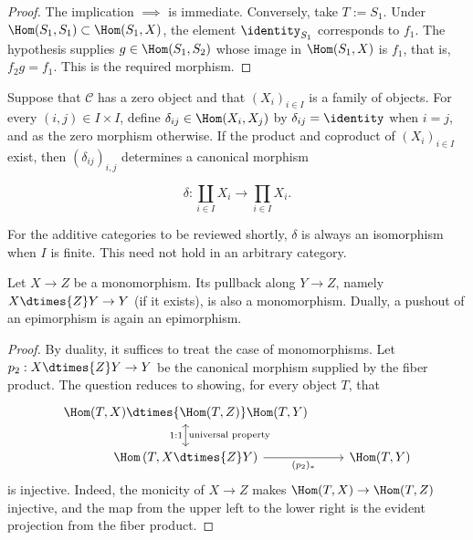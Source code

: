 \begin{proof}
	The implication $\implies$ is immediate. Conversely, take $T:=S_1$.
	Under $\Hom(S_1,S_1)\subset\Hom(S_1,X)$, the element
	$\identity_{S_1}$ corresponds to $f_1$. The hypothesis supplies
	$g\in\Hom(S_1,S_2)$ whose image in $\Hom(S_1,X)$ is $f_1$, that is,
	$f_2g=f_1$. This is the required morphism.
\end{proof}

Suppose that $\mathcal C$ has a zero object and that $(X_i)_{i\in I}$ is a
family of objects. For every $(i,j)\in I\times I$, define
$\delta_{ij}\in\Hom(X_i,X_j)$ by $\delta_{ij}=\identity$ when $i=j$, and as
the zero morphism otherwise. If the product and coproduct of
$(X_i)_{i\in I}$ exist, then $(\delta_{ij})_{i,j}$ determines a canonical
morphism

\begin{equation}\label{eqn:coprod-prod-delta}
	\delta: \coprod_{i \in I} X_i \to \prod_{i \in I} X_i.
\end{equation}

For the additive categories to be reviewed shortly, $\delta$ is always an
isomorphism when $I$ is finite. This need not hold in an arbitrary category.

\begin{lemma}\label{prop:mono-pullback}
	Let $X\to Z$ be a monomorphism. Its pullback along $Y\to Z$, namely
	$X\dtimes{Z}Y\to Y$ (if it exists), is also a monomorphism. Dually, a
	pushout of an epimorphism is again an epimorphism.
\end{lemma}

\begin{proof}
	By duality, it suffices to treat the case of monomorphisms. Let
	$p_2:X\dtimes{Z}Y\to Y$ be the canonical morphism supplied by the fiber
	product. The question reduces to showing, for every object $T$, that
	\[\begin{tikzcd}
		\Hom(T,X) \dtimes{\Hom(T,Z)} \Hom(T,Y) & \\
		\Hom\left(T, X \dtimes{Z} Y \right) \arrow[leftrightarrow, u, "1:1", "\text{universal property}"'] \arrow[r, "{(p_2)_*}"'] & \Hom(T, Y)
	\end{tikzcd} \]
	is injective. Indeed, the monicity of $X\to Z$ makes
	$\Hom(T,X)\to\Hom(T,Z)$ injective, and the map from the upper left to the
	lower right is the evident projection from the fiber product.
\end{proof}

